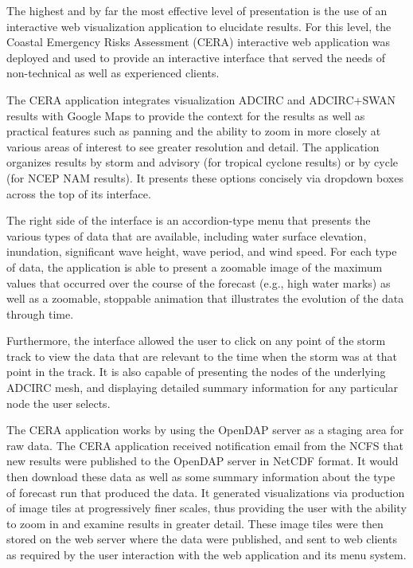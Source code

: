 \documentclass[jmse,article,submit,moreauthors,pdftex,12pt,a4paper]{mdpi}
\begin{document}
The highest and by far the most effective level of presentation is 
the use of an interactive web visualization application to elucidate 
results. For this level, the Coastal Emergency Risks Assessment 
(CERA) interactive web application was deployed and used to provide 
an interactive interface that served the needs of non-technical as 
well as experienced clients. 

The CERA application integrates visualization ADCIRC and ADCIRC+SWAN 
results with Google Maps to provide the context for the results as 
well as practical features such as panning and the ability to zoom 
in more closely at various areas of interest to see greater 
resolution and detail. The application organizes results by storm 
and advisory (for tropical cyclone results) or by cycle (for NCEP 
NAM results). It presents these options concisely via dropdown boxes 
across the top of its interface.

The right side of the interface is an accordion-type menu that 
presents the various types of data that are available, including 
water surface elevation, inundation, significant wave height, wave 
period, and wind speed. For each type of data, the application is 
able to present a zoomable image of the maximum values that occurred 
over the course of the forecast (e.g., high water marks) as well as 
a zoomable, stoppable animation that illustrates the evolution of 
the data through time. 

Furthermore, the interface allowed the user to click on any point of 
the storm track to view the data that are relevant to the time when 
the storm was at that point in the track. It is also capable of 
presenting the nodes of the underlying ADCIRC mesh, and displaying 
detailed summary information for any particular node the user 
selects. 

The CERA application works by using the OpenDAP server as a staging 
area for raw data. The CERA application received notification email 
from the NCFS that new results were published to the OpenDAP server 
in NetCDF format. It would then download these data as well as some 
summary information about the type of forecast run that produced the 
data. It generated visualizations via production of image tiles at 
progressively finer scales, thus providing the user with the ability 
to zoom in and examine results in greater detail. These image tiles 
were then stored on the web server where the data were published, 
and sent to web clients as required by the user interaction with the 
web application and its menu system.
\end{document}
